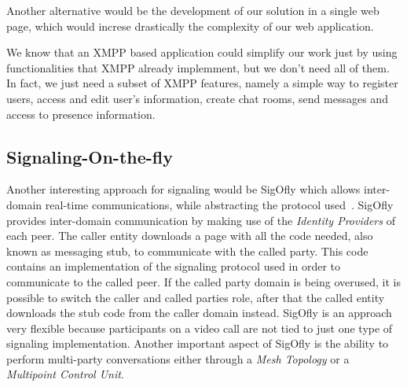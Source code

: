 {    Another alternative would be the development of our solution in a single web page, which would increse drastically the complexity of our web application.

    We know that an \ac{XMPP} based application could simplify our work just by using functionalities that \ac{XMPP} already implemment, but  we don't need all of them. In fact, we just need a subset of \ac{XMPP} features, namely a simple way to register users, access and edit user's information, create chat rooms, send messages and access to presence information.
}

  \subsection{Signaling-On-the-fly}


  Another interesting approach for signaling would be \ac{SigOfly} which allows inter-domain real-time communications, while abstracting the protocol used~\cite{sigofly}.
  \ac{SigOfly} provides inter-domain communication by making use of the \emph{Identity Providers} of each peer. 
  The caller entity downloads a page with all the code needed, also known as messaging stub, to communicate with the called party.
  This code contains an implementation of the signaling protocol used in order to communicate to the called peer. If the called party domain is being overused, it is possible to switch the caller and called parties role, after that the called entity downloads the stub code from the caller domain instead.
  \ac{SigOfly} is an approach very flexible because participants on a video call are not tied to just one type of signaling implementation. Another important aspect of \ac{SigOfly} is the ability to perform multi-party conversations either through a \emph{Mesh Topology} or a \emph{Multipoint Control Unit}.
